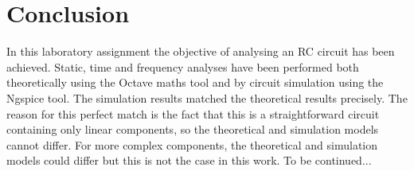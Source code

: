 \section{Conclusion}
\label{sec:conclusion}

In this laboratory assignment the objective of analysing an RC circuit has been achieved. Static, time and frequency analyses have been performed both theoretically using the Octave maths tool and by circuit simulation using the Ngspice tool. The simulation results matched the theoretical results precisely. The reason for this perfect match is the fact that this is a straightforward circuit containing only linear components, so the theoretical and simulation models cannot differ. For more complex components, the theoretical and simulation models could differ but this is not the case in this work. To be continued...
